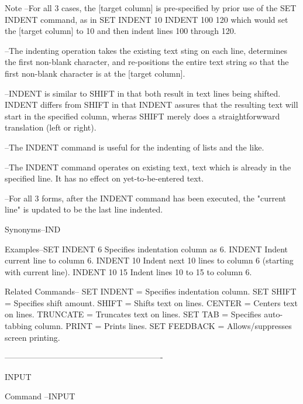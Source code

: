 Note    --For all 3 cases, the    [target column]
          is pre-specified by prior use of the
          SET INDENT command, as in
             SET INDENT 10
             INDENT 100 120
          which would set the [target column] to 10
          and then indent lines 100 through 120.
 
        --The indenting operation takes the existing
          text sting on each line, determines the first
          non-blank character, and re-positions the entire
          text string so that the first non-blank
          character is at the     [target column].
 
        --INDENT is similar to SHIFT in that
          both result in text lines being shifted.
          INDENT differs from SHIFT in that
          INDENT assures that the resulting text
          will start in the specified column,
          wheras SHIFT merely does a straightforwward
          translation (left or right).
 
        --The INDENT command is useful for the
          indenting of lists and the like.
 
        --The INDENT command operates on existing text,
          text which is already in the specified line.
          It has no effect on yet-to-be-entered text.
 
        --For all 3 forms, after the INDENT command
          has been executed, the "current line" is
          updated to be the last line indented.
 
Synonyms--IND
 
Examples--SET INDENT 6     Specifies indentation column as 6.
          INDENT           Indent current line to column 6.
          INDENT 10        Indent next 10 lines to column 6
                           (starting with current line).
          INDENT 10 15     Indent lines 10 to 15 to column 6.
 
Related Commands--
          SET INDENT      = Specifies indentation column.
          SET SHIFT       = Specifies shift amount.
          SHIFT           = Shifts text on lines.
          CENTER          = Centers text on lines.
          TRUNCATE        = Truncates text on lines.
          SET TAB         = Specifies auto-tabbing column.
          PRINT           = Prints lines.
          SET FEEDBACK    = Allows/suppresses screen printing.
 
----------------------------------------------------------
 
INPUT
 
Command --INPUT
 
